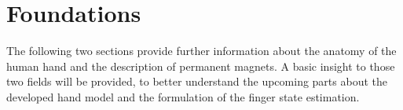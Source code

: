 
\lhead[\chaptername~\thechapter]{\rightmark}

\rhead[\leftmark]{}

\lfoot[\thepage]{}

\cfoot{}

\rfoot[]{\thepage}


\chapter{Foundations} \label{cha:foundations}

The following two sections provide further information about the anatomy of the human hand and the description of permanent magnets. A basic insight to those two fields will be provided, to better understand the upcoming parts about the developed hand model and the formulation of the finger state estimation.

